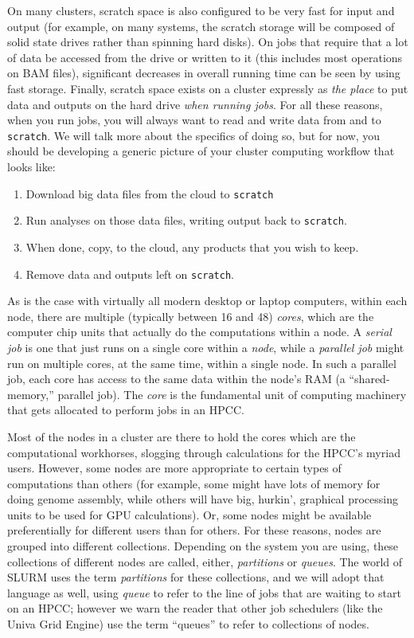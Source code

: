 \documentclass[]{krantz}
\providecommand{\tightlist}{%
  \setlength{\itemsep}{0pt}\setlength{\parskip}{0pt}}
\begin{document}
On many clusters, scratch space is also configured to be very fast for input and output
(for example, on many systems, the scratch storage will be composed of solid state drives rather
than spinning hard disks). On jobs that require that a lot of data be accessed from the
drive or written to it (this includes most operations on BAM files), significant decreases
in overall running time can be seen by using fast storage. Finally, scratch space exists on a cluster
expressly as \emph{the place} to put data and outputs on the hard drive \emph{when running jobs}. For all these
reasons, when you run jobs, you will always want to read and write data from and to \texttt{scratch}. We
will talk more about the specifics of doing so, but for now, you should be developing a generic picture
of your cluster computing workflow that looks like:

\begin{enumerate}
\def\labelenumi{\arabic{enumi}.}
\tightlist
\item
  Download big data files from the cloud to \texttt{scratch}
\item
  Run analyses on those data files, writing output back to \texttt{scratch}.
\item
  When done, copy, to the cloud, any products that you wish to keep.
\item
  Remove data and outputs left on \texttt{scratch}.
\end{enumerate}

As is the case with virtually all modern desktop or laptop computers, within each node,
there are multiple (typically between 16 and 48) \emph{cores}, which are the computer chip units that actually
do the computations within a node. A \emph{serial job} is one that just runs on a single core
within a \emph{node}, while a \emph{parallel job} might run on multiple cores, at the same time, within
a single node. In such a parallel job, each core has access to the same data within the
node's RAM (a ``shared-memory,'' parallel job). The \emph{core}
is the fundamental unit of computing machinery that gets allocated to perform jobs in an HPCC.

Most of the nodes in a cluster are there to hold the cores which are the computational workhorses,
slogging through calculations for the HPCC's myriad users. However, some nodes
are more appropriate to certain types of computations than others (for example, some
might have lots of memory for doing genome assembly, while others will have
big, hurkin', graphical processing units to be used for GPU calculations). Or, some nodes
might be available preferentially for different users than for others. For these
reasons, nodes are grouped into different collections. Depending on the system you are
using, these collections of different nodes are called, either, \emph{partitions} or \emph{queues}.
The world of SLURM uses the term \emph{partitions} for these collections, and we will adopt
that language as well, using \emph{queue} to refer to the line of jobs that are waiting to start
on an HPCC; however we warn the reader that other job schedulers (like the Univa Grid Engine)
use the term ``queues'' to refer to collections of nodes.
\end{document}
